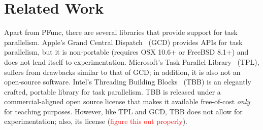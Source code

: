 \documentclass[9pt,twocolumn,letter]{article}
\begin{document}
\section{Related Work}
Apart from PFunc, there are several libraries that provide support for task 
parallelism.
%
Apple's Grand Central Dispatch~\cite{kn:gcd} (GCD) provides APIs for task
parallelism, but it is non-portable (requires OSX 10.6+ or FreeBSD 8.1+) and
does not lend itself to experimentation.
%
Microsoft's Task Parallel Library~\cite{kn:tpl} (TPL), suffers from drawbacks
similar to that of GCD; in addition, it is also not an open-source software.
%
Intel's Threading Building Blocks~\cite{kn:tbb} (TBB) is an elegantly crafted,
portable library for task parallelism.
%
TBB is released under a commercial-aligned open source license that makes it
available free-of-cost \textit{only} for teaching purposes.
%
However, like TPL and GCD, TBB does not allow for experimentation; also, its 
license (\textcolor{red}{figure this out properly}).

\footnotesize


\end{document}
